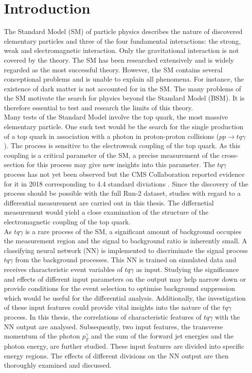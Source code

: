 \chapter{Introduction}

The Standard Model (SM) of particle physics  describes the nature of discovered elementary particles and three of the four fundamental interactions: the strong, weak and electromagnetic interaction. Only the gravitational interaction is not covered by the theory. The SM has been researched extensively and is widely regarded as the most successful theory. 
However, the SM contains several conceptional problems and is unable to explain all phenomena. For instance, the existence of dark matter is not accounted for in the SM. The many problems of the SM motivate the search for physics beyond the Standard Model (BSM). 
It is therefore essential to test and research the limits of this theory. \\
Many tests of the Standard Model involve the top quark, the most massive elementary particle. One such test would be the search for the single production of a top quark in association with a photon in proton-proton collisions ($pp \rightarrow tq\gamma$). 
The process is sensitive to the electroweak coupling of the top quark. As this coupling is a critical parameter of the SM, a precise measurement of the cross-section for this process may give new insights into this parameter. 
The $tq\gamma$ process has not yet been observed but the CMS Collaboration reported evidence for it in 2018 corresponding to 4.4 standard diviations \cite{CMS2}. Since the discovery of the process should be possible with the full Run-2 dataset, studies with regard to a differential measurement are carried out in this thesis. 
The differnetial measurement would yield a close examination of the structure of the electromagnetic coupling of the top quark. \\
As $tq\gamma$ is a rare process of the SM, a significant amount of background occupies the measurement region and the signal to background ratio is inherently small. A classifying neural network (NN) is implemented to discriminate the signal process $tq\gamma$ from the background processes. 
This NN is trained on simulated data and receives characteristic event variables of $tq\gamma$ as input. 
Studying the significance and effects of different input parameters on the output may help narrow down or provide conditions for the event selection to optimise background suppression which would be useful for the differential analysis. Additionally, the investigation of these input features could provide vital insights into the nature of the $tq\gamma$ process. 
In this thesis, the correlations of characteristic features of $tq\gamma$ with the NN output are analysed. 
Subsequently, two input features, the transverse momentum of the photon $p_T^\gamma$ and the sum of the forward jet energies and the photon energy, are further studied. 
These input features are divided into specific energy regions. The effects of different divisions on the NN output are then thoroughly examined and discussed.


